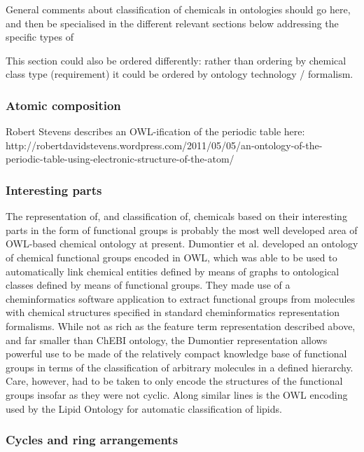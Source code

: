 \documentclass[10pt]{bmc_article}
\newenvironment{bmcformat}{\baselineskip20pt\sloppy\setboolean{publ}{false}}{\baselineskip20pt\sloppy}
\begin{document}
\begin{bmcformat}
General comments about classification of chemicals in ontologies should go here, and then be specialised in the different relevant sections below addressing the specific types of 

This section could also be ordered differently: rather than ordering by chemical class type (requirement) it could be ordered by ontology technology / formalism. 

\subsubsection*{Atomic composition}

Robert Stevens describes an OWL-ification of the periodic table here: http://robertdavidstevens.wordpress.com/2011/05/05/an-ontology-of-the-periodic-table-using-electronic-structure-of-the-atom/



\subsubsection*{Interesting parts}

The representation of, and classification of, chemicals based on their interesting parts in the form of functional groups is probably the most well developed area of OWL-based chemical ontology at present. Dumontier et al. \cite{dumontier2007} developed an ontology of chemical functional groups encoded in OWL, which was able to be used to automatically link chemical entities defined by means of graphs to ontological classes defined by means of functional groups. They made use of a cheminformatics software application to extract functional groups from molecules with chemical structures specified in standard cheminformatics representation formalisms. While not as rich as the feature term representation described above, and far smaller than ChEBI ontology, the Dumontier representation allows powerful use to be made of the relatively compact knowledge base of functional groups in terms of the classification of arbitrary molecules in a defined hierarchy. Care, however, had to be taken to only encode the structures of the functional groups insofar as they were not cyclic. Along similar lines is the OWL encoding used by the Lipid Ontology \cite{chepelevlipids2011} for automatic classification of lipids. 


\subsubsection*{Cycles and ring arrangements}


\end{bmcformat}
\end{document}
